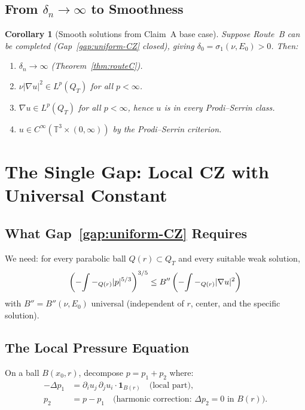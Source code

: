 \documentclass[11pt]{article}
\newtheorem{corollary}[theorem]{Corollary}
\theoremstyle{definition}
\theoremstyle{remark}
\newcommand{\T}{\mathbb{T}}
\newcommand{\grad}{\nabla}
\newcommand{\Xint}{\mathop{\mathchoice{\vcenter{\hbox{$\displaystyle-$}}}%
  {\vcenter{\hbox{$\textstyle-$}}}%
  {\vcenter{\hbox{$\scriptstyle-$}}}%
  {\vcenter{\hbox{$\scriptscriptstyle-$}}}}\!\int}
\begin{document}
\subsection{From $\delta_n\to\infty$ to Smoothness}

\begin{corollary}[Smooth solutions from Claim~A base case]\label{cor:smooth}
  Suppose Route~B can be completed (Gap~\ref{gap:uniform-CZ} closed), giving
  $\delta_0 = \sigma_1(\nu,E_0) > 0$.  Then:
  \begin{enumerate}[label=(\roman*)]
  \item $\delta_n\to\infty$ (Theorem~\ref{thm:routeC}).
  \item $\nu|\grad u|^2\in L^p(Q_T)$ for all $p<\infty$.
  \item $\grad u\in L^p(Q_T)$ for all $p<\infty$, hence $u$ is in every
    Prodi--Serrin class.
  \item $u\in C^\infty(\T^3\times(0,\infty))$ by the Prodi--Serrin criterion.
  \end{enumerate}
\end{corollary}

\section{The Single Gap: Local CZ with Universal Constant}
\label{sec:gap-analysis}

\subsection{What Gap~\ref{gap:uniform-CZ} Requires}

We need: for every parabolic ball $Q(r)\subset Q_T$ and every suitable
weak solution,
\begin{equation}\label{eq:local-CZ-goal}
  \left(\Xint-_{Q(r)}|p|^{5/3}\right)^{3/5}
  \leq B''\left(\Xint-_{Q(r)}|\grad u|^2\right)
\end{equation}
with $B'' = B''(\nu,E_0)$ universal (independent of $r$, center, and the
specific solution).

\subsection{The Local Pressure Equation}

On a ball $B(x_0,r)$, decompose $p = p_1 + p_2$ where:
\begin{align}
  -\Delta p_1 &= \partial_i u_j\,\partial_j u_i\cdot\mathbf{1}_{B(r)}
    \quad\text{(local part)},\\
  p_2 &= p - p_1\quad\text{(harmonic correction: }\Delta p_2 = 0\text{ in }B(r)).
\end{align}
\end{document}
